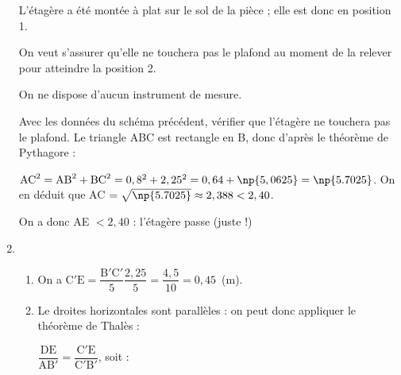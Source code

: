 \begin{enumerate}
L'étagère a été montée à plat sur le sol de la pièce ; elle est donc en position 1.

On veut s'assurer qu'elle ne touchera pas le plafond au moment de la relever pour atteindre la position 2. 

On ne dispose d'aucun instrument de mesure.

Avec les données du schéma précédent, vérifier que l'étagère ne touchera pas le plafond.
Le triangle ABC est rectangle en B, donc d'après le théorème de Pythagore :

$\text{AC}^2 = \text{AB}^2 + \text{BC}^2 = 0,8^2 + 2,25^2 = 0,64 + \np{5,0625} = \np{5.7025}$.
On en déduit que AC $ = \sqrt{\np{5.7025}} \approx 2,388 < 2,40$.

On a donc AE $ < 2,40$ : l'étagère passe (juste !)
\item %



	\begin{enumerate}
		\item %
On a $\text{C}'\text{E} = \dfrac{\text{B}'\text{C}'}{5} \dfrac{2,25}{5} = \dfrac{4,5}{10} = 0,45$~(m).
		\item %
Le droites horizontales sont parallèles : on peut donc appliquer le théorème de Thalès :
		
$\dfrac{\text{DE}}{\text{AB}'} = \dfrac{\text{C}'\text{E}}{\text{C}'\text{B}'}$, soit :


\end{enumerate}
\end{enumerate}
